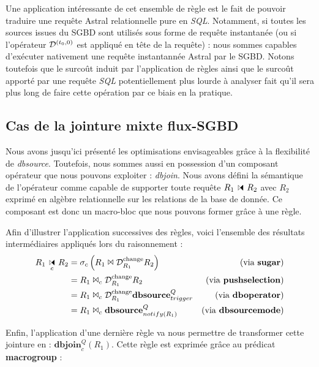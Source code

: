 Une application intéressante de cet ensemble de règle est le fait de pouvoir traduire une requête Astral relationnelle pure en \textit{SQL}. Notamment, si toutes les sources issues du SGBD sont utilisés sous forme de requête instantanée (ou si l'opérateur $\mathcal{D}^{(t_0,0)}$ est appliqué en tête de la requête) : nous sommes capables d'exécuter nativement une requête instantannée Astral par le SGBD. Notons toutefois que le surcoût induit par l'application de règles ainsi que le surcoût apporté par une requête \textit{SQL} potentiellement plus lourde à analyser fait qu'il sera plus long de faire cette opération par ce biais en la pratique.

\subsection{Cas de la jointure mixte flux-SGBD}
Nous avons jusqu'ici présenté les optimisations envisageables grâce à la flexibilité de \textit{dbsource}. Toutefois, nous sommes aussi en possession d'un composant opérateur que nous pouvons exploiter : \textit{dbjoin}. Nous avons défini la sémantique de l'opérateur comme capable de supporter toute requête $R_1\ssjoin R_2$ avec $R_2$ exprimé en algèbre relationnelle sur les relations de la base de donnée. Ce composant est donc un macro-bloc que nous pouvons former grâce à une règle.

Afin d'illustrer l'application successives des règles, voici l'ensemble des résultats intermédiaires appliqués lors du raisonnement :
\begin{align*} 
R_1\ssjoin_c R_2 &= \sigma_c \left(R_1 \Join \D^{\mathrm{change}}_{R_1} R_2\right) & \text{(via \textbf{sugar})}\\
& =  R_1 \Join_c \D^{\mathrm{change}}_{R_1} R_2 & \text{(via \textbf{pushselection})}\\
& =  R_1 \Join_c \D^{\mathrm{change}}_{R_1} \textbf{dbsource}_{trigger}^{Q} & \text{(via \textbf{dboperator})}\\
& =  R_1 \Join_c \textbf{dbsource}_{notify(R_1)}^{Q} & \text{(via \textbf{dbsourcemode})}
\end{align*}

Enfin, l'application d'une dernière règle va nous permettre de transformer cette jointure en : $\textbf{dbjoin}^Q_c (R_1)$. Cette règle est exprimée grâce au prédicat \textbf{macrogroup} :

